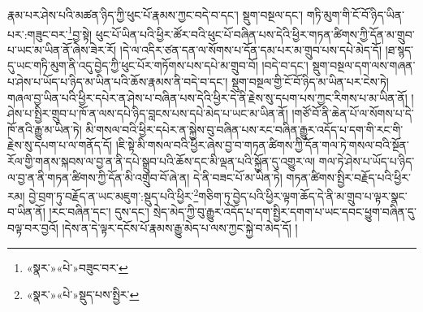 རྣམ་པར་ཤེས་པའི་མཚན་ཉིད་ཀྱི་ཕུང་པོ་རྣམས་ཀྱང་བདེ་བ་དང་། སྡུག་བསྔལ་དང་། གཏི་མུག་གི་ངོ་བོ་ཉིད་ཡིན་པར་:གཟུང་བར་\footnote{«སྣར་»«པེ་»བཟུང་བར་}བྱ་སྟེ། ཕུང་པོ་ཡིན་པའི་ཕྱིར་ཚོར་བའི་ཕུང་པོ་བཞིན་པས་དེའི་ཕྱིར་གཏན་ཚིགས་ཀྱི་དོན་མ་གྲུབ་པ་ཡང་མ་ཡིན་ནོ་ཞེས་ཟེར་རོ། །དེ་ལ་འདིར་ཙན་དན་ལ་སོགས་པ་དོན་དམ་པར་མ་གྲུབ་པས་དཔེ་མེད་དོ། །ཐ་སྙད་དུ་ཡང་གཏི་མུག་ནི་འདུ་བྱེད་ཀྱི་ཕུང་པོར་གཏོགས་པས་དཔེ་མ་གྲུབ་བོ། །བདེ་བ་དང་། སྡུག་བསྔལ་དག་ལས་གཞན་པ་ཤེས་པ་ཡོད་པ་ཉིད་མ་ཡིན་པའི་ཆོས་རྣམས་ནི་བདེ་བ་དང་། སྡུག་བསྔལ་གྱི་ངོ་བོ་ཉིད་མ་ཡིན་པར་ངེས་ཏེ། གཞལ་བྱ་ཡིན་པའི་ཕྱིར་དཔེར་ན་ཤེས་པ་བཞིན་པས་དེའི་ཕྱིར་དེ་ནི་རྗེས་སུ་དཔག་པས་ཀྱང་རིགས་པ་མ་ཡིན་ནོ། །ཤེས་པ་སྤྱིར་གྲུབ་པ་ཁོ་ན་ལས་དཔེ་ཉིད་བླངས་པས་དཔེ་མེད་པ་ཡང་མ་ཡིན་ནོ། །གཙོ་བོ་ནི་ཆེན་པོ་ལ་སོགས་པ་དེ་ཁོ་ནའི་རྒྱུ་མ་ཡིན་ཏེ། མི་གསལ་བའི་ཕྱིར་དཔེར་ན་སྐྱེས་བུ་བཞིན་པས་རང་བཞིན་རྒྱུར་འདོད་པ་དག་གི་རང་གི་རྗེས་སུ་དཔག་པ་ལ་གནོད་དོ། །ཇི་སྟེ་མི་གསལ་བའི་ཕྱིར་ཞེས་བྱ་བ་གཏན་ཚིགས་ཀྱི་དོན་གལ་ཏེ་གསལ་བའི་སྔོན་རོལ་གྱི་གནས་སྐབས་ལ་བྱ་ན་ནི་དཔེ་སྒྲུབ་པའི་ཆོས་དང་མི་ལྡན་པའི་སྐྱོན་དུ་འགྱུར་ལ། གལ་ཏེ་ཤེས་པ་ཡོད་པ་ཉིད་ལ་བྱ་ན་ནི་གཏན་ཚིགས་ཀྱི་དོན་མི་འགྲུབ་བོ་ཞེ་ན། དེ་ནི་བཟང་པོ་མ་ཡིན་ཏེ། གཏན་ཚིགས་སྤྱིར་བརྗོད་པའི་ཕྱིར་རམ། བྱེ་བྲག་ཏུ་བརྗོད་ན་ཡང་མཇུག་:སྡུད་པའི་ཕྱིར་\footnote{«སྣར་»«པེ་»སྡུད་པས་སྤྱིར་}གཅིག་ཏུ་བྱེད་པའི་ཕྱིར་ལྟག་ཆོད་དེ་ནི་མ་གྲུབ་པ་ལྟར་སྣང་བ་ཡིན་ནོ། །རང་བཞིན་དང་། དུས་དང་། སྲེད་མེད་ཀྱི་བུ་རྒྱུར་འདོད་པ་དག་སྤྱིར་དགག་པ་ཡང་དབང་ཕྱུག་བཞིན་དུ་བལྟ་བར་བྱའོ། །དེས་ན་དེ་ལྟར་དངོས་པོ་རྣམས་རྒྱུ་མེད་པ་ལས་ཀྱང་སྐྱེ་བ་མེད་དོ། །
